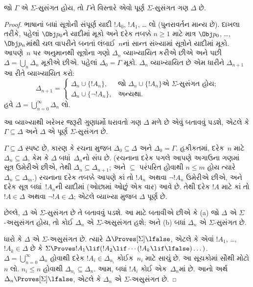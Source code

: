 \begin{thm}
  જો $\Gamma$ એ $\Sigma$-સુસંગત હોય, તો $\Gamma$ને વિસ્તારે એવો
  પૂર્ણ $\Sigma$-સુસંગત ગણ $\Delta$ છે.
\end{thm}

\begin{proof}
ભાષાનાં બધાં સૂત્રોની સંપૂર્ણ યાદી $!A_0$, $!A_1$, \dots{} લો
(પુનરાવર્તન માન્ય છે). દાખલા તરીકે, પહેલાં $\Obj p_0$ને યાદીમાં
મૂકો અને દરેક તબક્કે $n \ge 1$ માટે માત્ર $\Obj p_0$,
\dots,~$\Obj p_n$માંથી ચલ વાપરીને બનતાં લંબાઈ~$n$નાં સાન્ત
સંખ્યામાં સૂત્રોને યાદીમાં મૂકો. આપણે~$n$ પર અનુમાનથી સૂત્રોના
ગણો $\Delta_n$ વ્યાખ્યાયિત કરીએ છીએ અને પછી $\Delta = \bigcup_n
\Delta_n$ મૂકીએ છીએ. પહેલાં $\Delta_0 = \Gamma$ મૂકો. $\Delta_n$
વ્યાખ્યાયિત છે એમ ધારીને $\Delta_{n+1}$ આ રીતે વ્યાખ્યાયિત કરો:
\[
\Delta_{n+1} =
\begin{cases}
  \Delta_n \cup \{!A_n\}, & \text{જો $\Delta_n \cup \{ !A_n\}$
    એ $\Sigma$-સુસંગત હોય;} \\
  \Delta_n \cup \{ \lnot !A_n\}, & \text{અન્યથા.}
\end{cases}
\]
હવે $\Delta = \bigcup_{n=0}^\infty \Delta_n$ લો.

આ વ્યાખ્યાથી ખરેખર જરૂરી ગુણધર્મો ધરાવતો ગણ $\Delta$ મળે છે એવું
બતાવવું પડશે, એટલે કે $\Gamma \subseteq \Delta$ અને $\Delta$ એ
પૂર્ણ $\Sigma$-સુસંગત છે.

$\Gamma \subseteq \Delta$ સ્પષ્ટ છે, કારણ કે રચના મુજબ $\Delta_0
\subseteq \Delta$ અને $\Delta_0 = \Gamma$. હકીકતમાં, દરેક~$n$ માટે
$\Delta_n \subseteq \Delta$, કેમ કે $\Delta$ બધાં~$\Delta_n$નો સંઘ
છે. (રચનાના દરેક પગલે આપણે અગાઉના ગણમાં સૂત્ર ઉમેરીએ છીએ,
તેથી $\Delta_n \subseteq \Delta_{n+1}$; અને $\subseteq$ પરંપરિત
હોવાથી $n \le m$ હોય ત્યારે $\Delta_n \subseteq \Delta_{m}$.)
રચનાના દરેક તબક્કે આપણે કાં તો $!A_n$ અથવા $\lnot !A_n$ ઉમેરીએ
છીએ, અને દરેક સૂત્ર બધાં~$!A_n$ની યાદીમાં (ઓછામાં ઓછું એક વાર)
આવે છે. તેથી દરેક $!A$ માટે કાં તો $!A \in \Delta$ અથવા
$\lnot !A \in \Delta$; એટલે વ્યાખ્યા મુજબ $\Delta$ પૂર્ણ છે.

છેલ્લે, $\Delta$ એ $\Sigma$-સુસંગત છે તે બતાવવું પડશે. આ માટે
બતાવીએ છીએ કે (a) જો $\Delta$ એ $\Sigma$-અસુસંગત હોય, તો કોઈ
$\Delta_n$ એ $\Sigma$-અસુસંગત હશે; અને (b) બધાં $\Delta_n$ એ
$\Sigma$-સુસંગત છે.

ધારો કે $\Delta$ એ $\Sigma$-અસુસંગત છે. ત્યારે $\Delta
\Proves[\Sigma] \lfalse$, એટલે કે એવાં $!A_1$, \dots,~$!A_k \in
\Delta$ છે કે $\Sigma \Proves !A_1 \lif (!A_2 \lif \cdots (!A_k
\lif \lfalse)\dots)$. $\Delta = \bigcup_{n=0}^\infty \Delta_n$
હોવાથી દરેક $!A_i \in \Delta_{n_i}$ કોઈક~$n_i$ માટે સાચું છે.
આ સૂચકોમાં સૌથી મોટો $n$ લો. $n_i \le n$ હોવાથી $\Delta_{n_i}
\subseteq \Delta_n$. આમ, બધાં $!A_i$ કોઈ એક~$\Delta_n$માં છે.
આનો અર્થ $\Delta_n \Proves[\Sigma] \lfalse$, એટલે કે $\Delta_n$
એ $\Sigma$-અસુસંગત છે.


\end{proof}
